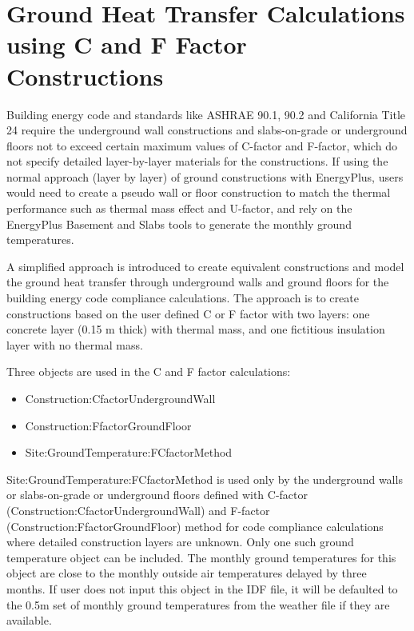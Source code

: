 \section{Ground Heat Transfer Calculations using C and F Factor Constructions}\label{ground-heat-transfer-calculations-using-c-and-f-factor-constructions}

Building energy code and standards like ASHRAE 90.1, 90.2 and California Title 24 require the underground wall constructions and slabs-on-grade or underground floors not to exceed certain maximum values of C-factor and F-factor, which do not specify detailed layer-by-layer materials for the constructions. If using the normal approach (layer by layer) of ground constructions with EnergyPlus, users would need to create a pseudo wall or floor construction to match the thermal performance such as thermal mass effect and U-factor, and rely on the EnergyPlus Basement and Slabs tools to generate the monthly ground temperatures.

A simplified approach is introduced to create equivalent constructions and model the ground heat transfer through underground walls and ground floors for the building energy code compliance calculations. The approach is to create constructions based on the user defined C or F factor with two layers: one concrete layer (0.15 m thick) with thermal mass, and one fictitious insulation layer with no thermal mass.

Three objects are used in the C and F factor calculations:

\begin{itemize}
\item
  Construction:CfactorUndergroundWall
\item
  Construction:FfactorGroundFloor
\item
  Site:GroundTemperature:FCfactorMethod
\end{itemize}

Site:GroundTemperature:FCfactorMethod is used only by the underground walls or slabs-on-grade or underground floors defined with C-factor (Construction:CfactorUndergroundWall) and F-factor (Construction:FfactorGroundFloor) method for code compliance calculations where detailed construction layers are unknown. Only one such ground temperature object can be included. The monthly ground temperatures for this object are close to the monthly outside air temperatures delayed by three months. If user does not input this object in the IDF file, it will be defaulted to the 0.5m set of monthly ground temperatures from the weather file if they are available.

